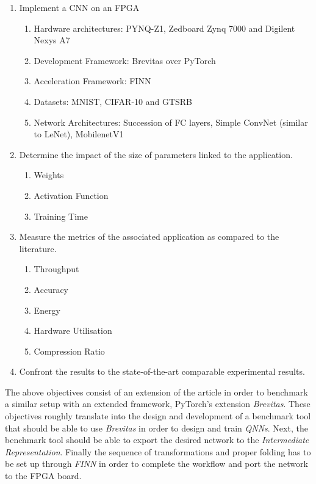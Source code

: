 \begin{enumerate}
  \item Implement a CNN on an FPGA
  \begin{enumerate}
    \item Hardware architectures: PYNQ-Z1, Zedboard Zynq 7000 and Digilent Nexys A7
    \item Development Framework: Brevitas over PyTorch
    \item Acceleration Framework: FINN
    \item Datasets: MNIST, CIFAR-10 and GTSRB
    \item Network Architectures: Succession of FC layers, Simple ConvNet (similar to LeNet), MobilenetV1
  \end{enumerate}
  \item Determine the impact of the size of parameters linked to the application.
  \begin{enumerate}
    \item Weights
    \item Activation Function
    \item Training Time
  \end{enumerate}
  \item Measure the metrics of the associated application as compared to the literature.
  \begin{enumerate}
    \item Throughput
    \item Accuracy
    \item Energy
    \item Hardware Utilisation
    \item Compression Ratio
  \end{enumerate}
  \item Confront the results to the state-of-the-art comparable experimental results.
\end{enumerate}

The above objectives consist of an extension of the \cite{Bacchus2020} article in order to benchmark a similar setup with an extended framework, PyTorch's extension \emph{Brevitas}. These objectives roughly translate into the design and development of a benchmark tool that should be able to use \emph{Brevitas} in order to design and train \emph{QNNs}. Next, the benchmark tool should be able to export the desired network to the \emph{Intermediate Representation}. Finally the sequence of transformations and proper folding has to be set up through \emph{FINN} in order to complete the workflow and port the network to the FPGA board.


